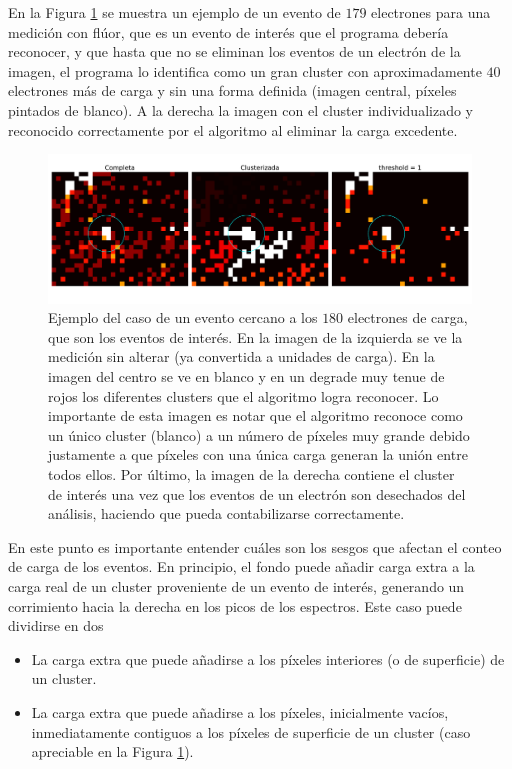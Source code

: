 En la Figura \ref{fig:ClusterPegoteado} se muestra un ejemplo de un evento de $179$ electrones para una medición con flúor, que es un evento de interés que el programa debería reconocer, y que hasta que no se eliminan los eventos de un electrón de la imagen, el programa lo identifica como un gran cluster con aproximadamente $40$ electrones más de carga y sin una forma definida (imagen central, píxeles pintados de blanco). A la derecha la imagen con el cluster individualizado y reconocido correctamente por el algoritmo al eliminar la carga excedente.
\begin{figure}[H]
    \centering
    \includegraphics[scale=0.4]{Figs/despegoteo_clusters.pdf}
    \caption{Ejemplo del caso de un evento cercano a los $180$ electrones de carga, que son los eventos de interés. En la imagen de la izquierda se ve la medición sin alterar (ya convertida a unidades de carga). En la imagen del centro se ve en blanco y en un degrade muy tenue de rojos los diferentes clusters que el algoritmo logra reconocer. Lo importante de esta imagen es notar que el algoritmo reconoce como un único cluster (blanco) a un número de píxeles muy grande debido justamente a que píxeles con una única carga generan la unión entre todos ellos. Por último, la imagen de la derecha contiene el cluster de interés una vez que los eventos de un electrón son desechados del análisis, haciendo que pueda contabilizarse correctamente.}
    \label{fig:ClusterPegoteado}
\end{figure}

En este punto es importante entender cuáles son los sesgos que afectan el conteo de carga de los eventos. En principio, el fondo puede añadir carga extra a la carga real de un cluster proveniente de un evento de interés, generando un corrimiento hacia la derecha en los picos de los espectros. Este caso puede dividirse en dos
\begin{itemize}
    \item La carga extra que puede añadirse a los píxeles interiores (o de superficie) de un cluster.
    \item La carga extra que puede añadirse a los píxeles, inicialmente vacíos, inmediatamente contiguos a los píxeles de superficie de un cluster (caso apreciable en la Figura \ref{fig:ClusterPegoteado}).
\end{itemize}

